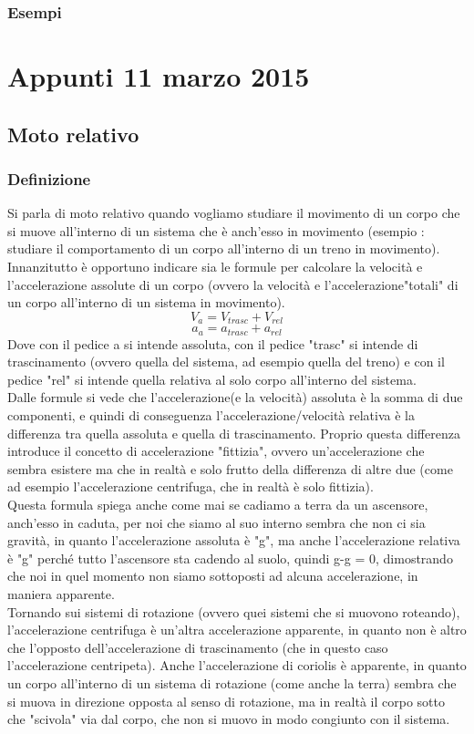 \documentclass[portrait]{article}
\begin{document}
\subsubsection{Esempi}
\newpage
\section{Appunti 11 marzo 2015}
\subsection{Moto relativo}
\subsubsection{Definizione}
Si parla di moto relativo quando vogliamo studiare il movimento di un corpo che si muove all'interno di un sistema che è anch'esso in movimento (esempio : studiare il comportamento di un corpo all'interno di un treno in movimento). \\
Innanzitutto è opportuno indicare sia le formule per calcolare la velocità e l'accelerazione assolute di un corpo (ovvero la velocità e l'accelerazione"totali" di un corpo all'interno di un sistema in movimento).
$$V_a = V_{trasc}  + V_{rel}$$
$$a_a = a_{trasc}  + a_{rel}$$
Dove con il pedice a si intende assoluta, con il pedice "trasc" si intende di trascinamento (ovvero quella del sistema, ad esempio quella del treno) e con il pedice "rel" si intende quella relativa al solo corpo all'interno del sistema. \\
Dalle formule si vede che l'accelerazione(e la velocità) assoluta è la somma di due componenti, e quindi di conseguenza l'accelerazione/velocità relativa è la differenza tra quella assoluta e quella di trascinamento. Proprio questa differenza introduce il concetto di accelerazione "fittizia", ovvero un'accelerazione che sembra esistere ma che in realtà e solo frutto della differenza di altre due (come ad esempio l'accelerazione centrifuga, che in realtà è solo fittizia). \\
Questa formula spiega anche come mai se cadiamo a terra da un ascensore, anch'esso in caduta, per noi che siamo al suo interno sembra che non ci sia gravità, in quanto l'accelerazione assoluta è "g", ma anche l'accelerazione relativa è "g" perché tutto l'ascensore sta cadendo al suolo, quindi g-g = 0, dimostrando che noi in quel momento non siamo sottoposti ad alcuna accelerazione, in maniera apparente. \\
Tornando sui sistemi di rotazione (ovvero quei sistemi che si muovono roteando), l'accelerazione centrifuga è un'altra accelerazione apparente, in quanto non è altro che l'opposto dell'accelerazione di trascinamento (che in questo caso l'accelerazione centripeta).
Anche l'accelerazione di coriolis è apparente, in quanto un corpo all'interno di un sistema di rotazione (come anche la terra) sembra che si muova in direzione opposta al senso di rotazione, ma in realtà il corpo sotto che "scivola" via dal corpo, che non si muovo in modo congiunto con il sistema.
\end{document}
